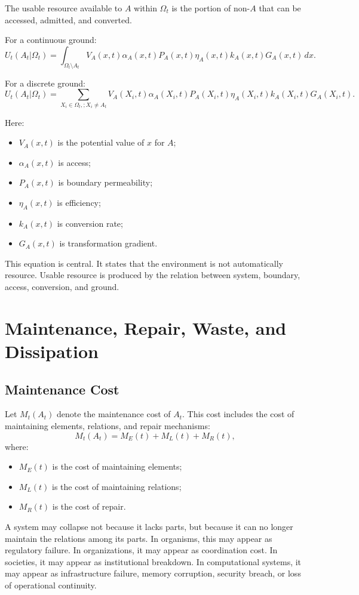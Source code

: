 \documentclass[11pt,a4paper]{article}
\begin{document}
The usable resource available to $A$ within $\Omega_t$ is the portion of non-$A$ that can be accessed, admitted, and converted.

For a continuous ground:
\[
U_t(A_t|\Omega_t)
=
\int_{\Omega_t\setminus A_t}
V_A(x,t)\alpha_A(x,t)P_A(x,t)\eta_A(x,t)k_A(x,t)G_A(x,t)\,dx.
\]

For a discrete ground:
\[
U_t(A_t|\Omega_t)
=
\sum_{X_i\in\Omega_t,;X_i\neq A_t}
V_A(X_i,t)\alpha_A(X_i,t)P_A(X_i,t)\eta_A(X_i,t)k_A(X_i,t)G_A(X_i,t).
\]

Here:
\begin{itemize}[leftmargin=2em]
\item $V_A(x,t)$ is the potential value of $x$ for $A$;
\item $\alpha_A(x,t)$ is access;
\item $P_A(x,t)$ is boundary permeability;
\item $\eta_A(x,t)$ is efficiency;
\item $k_A(x,t)$ is conversion rate;
\item $G_A(x,t)$ is transformation gradient.
\end{itemize}

This equation is central. It states that the environment is not automatically resource. Usable resource is produced by the relation between system, boundary, access, conversion, and ground.

\section{Maintenance, Repair, Waste, and Dissipation}

\subsection{Maintenance Cost}

Let $M_t(A_t)$ denote the maintenance cost of $A_t$. This cost includes the cost of maintaining elements, relations, and repair mechanisms:
\[
M_t(A_t)=M_E(t)+M_L(t)+M_R(t),
\]
where:
\begin{itemize}[leftmargin=2em]
\item $M_E(t)$ is the cost of maintaining elements;
\item $M_L(t)$ is the cost of maintaining relations;
\item $M_R(t)$ is the cost of repair.
\end{itemize}

A system may collapse not because it lacks parts, but because it can no longer maintain the relations among its parts. In organisms, this may appear as regulatory failure. In organizations, it may appear as coordination cost. In societies, it may appear as institutional breakdown. In computational systems, it may appear as infrastructure failure, memory corruption, security breach, or loss of operational continuity.
\end{document}

